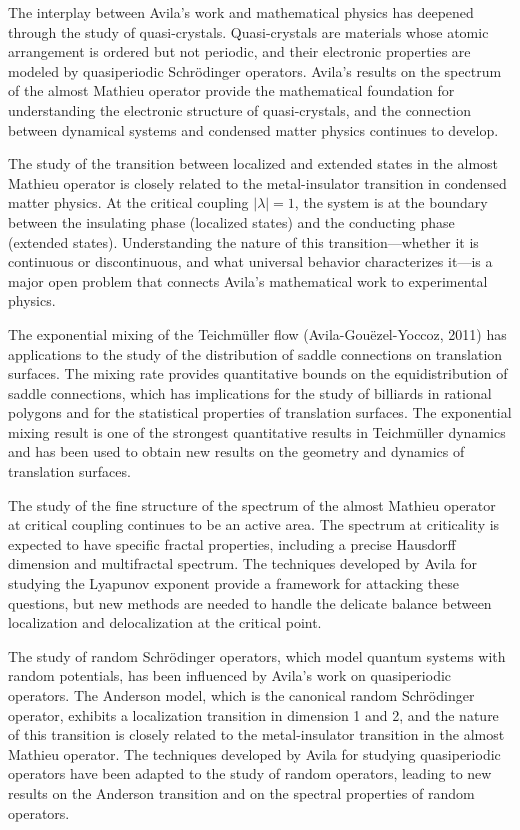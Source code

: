 The interplay between Avila's work and mathematical physics has deepened through the study of quasi-crystals. Quasi-crystals are materials whose atomic arrangement is ordered but not periodic, and their electronic properties are modeled by quasiperiodic Schr\"{o}dinger operators. Avila's results on the spectrum of the almost Mathieu operator provide the mathematical foundation for understanding the electronic structure of quasi-crystals, and the connection between dynamical systems and condensed matter physics continues to develop.

The study of the transition between localized and extended states in the almost Mathieu operator is closely related to the metal-insulator transition in condensed matter physics. At the critical coupling $|\lambda|=1$, the system is at the boundary between the insulating phase (localized states) and the conducting phase (extended states). Understanding the nature of this transition---whether it is continuous or discontinuous, and what universal behavior characterizes it---is a major open problem that connects Avila's mathematical work to experimental physics.

The exponential mixing of the Teichm\"{u}ller flow (Avila-Gou\"{e}zel-Yoccoz, 2011) has applications to the study of the distribution of saddle connections on translation surfaces. The mixing rate provides quantitative bounds on the equidistribution of saddle connections, which has implications for the study of billiards in rational polygons and for the statistical properties of translation surfaces. The exponential mixing result is one of the strongest quantitative results in Teichm\"{u}ller dynamics and has been used to obtain new results on the geometry and dynamics of translation surfaces.

The study of the fine structure of the spectrum of the almost Mathieu operator at critical coupling continues to be an active area. The spectrum at criticality is expected to have specific fractal properties, including a precise Hausdorff dimension and multifractal spectrum. The techniques developed by Avila for studying the Lyapunov exponent provide a framework for attacking these questions, but new methods are needed to handle the delicate balance between localization and delocalization at the critical point.

The study of random Schr\"{o}dinger operators, which model quantum systems with random potentials, has been influenced by Avila's work on quasiperiodic operators. The Anderson model, which is the canonical random Schr\"{o}dinger operator, exhibits a localization transition in dimension 1 and 2, and the nature of this transition is closely related to the metal-insulator transition in the almost Mathieu operator. The techniques developed by Avila for studying quasiperiodic operators have been adapted to the study of random operators, leading to new results on the Anderson transition and on the spectral properties of random operators.

